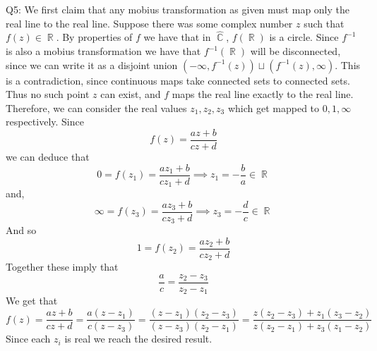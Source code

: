 \documentclass[letterpaper]{article}
\DeclareMathOperator{\R}{\mathbb{R}}
\DeclareMathOperator{\C}{\mathbb{C}}
\begin{document}
\noindent
Q5: We first claim that any mobius transformation as given must map only the real line to the real line. Suppose there was some complex number $z$ such that $f(z)\in \R$. By properties of $f$ we have that in $\hat{\C}$, $f(\R)$ is a circle. Since $f^{-1}$ is also a mobius transformation we have that $f^{-1}(\R)$ will be disconnected, since we can write it as a disjoint union $(-\infty , f^{-1}(z))\sqcup (f^{-1}(z), \infty) $. This is a contradiction, since continuous maps take connected sets to connected sets. Thus no such point $z$ can exist, and $f$ maps the real line exactly to the real line. Therefore, we can consider the real values $z_1,z_2,z_3$ which get mapped to $0,1,\infty$
respectively. Since $$f(z) = \frac{az+b}{cz+d}$$ we can deduce that $$0 = f(z_1) = \frac{az_1 + b}{cz_1 +d} \implies z_1 = - \frac{b}{a} \in \R$$
and, $$\infty = f(z_3) = \frac{az_3 + b}{cz_3 + d} \implies z_3 = - \frac{d}{c} \in \R$$
And so 
$$1 = f(z_2)= \frac{az_2 + b}{cz_2 + d}$$
Together these imply that $$\frac{a}{c} = \frac{z_2-z_3}{z_2-z_1}$$
We get that $$f(z) = \frac{az+b}{cz+d} = \frac{a(z-z_1)}{c(z-z_3)} = \frac{(z-z_1)(z_2-z_3)}{(z-z_3)(z_2-z_1)} = \frac{z(z_2-z_3) + z_1(z_3-z_2)}{z(z_2-z_1) + z_3(z_1-z_2)}$$
Since each $z_i$ is real we reach the desired result. 
\end{document}
